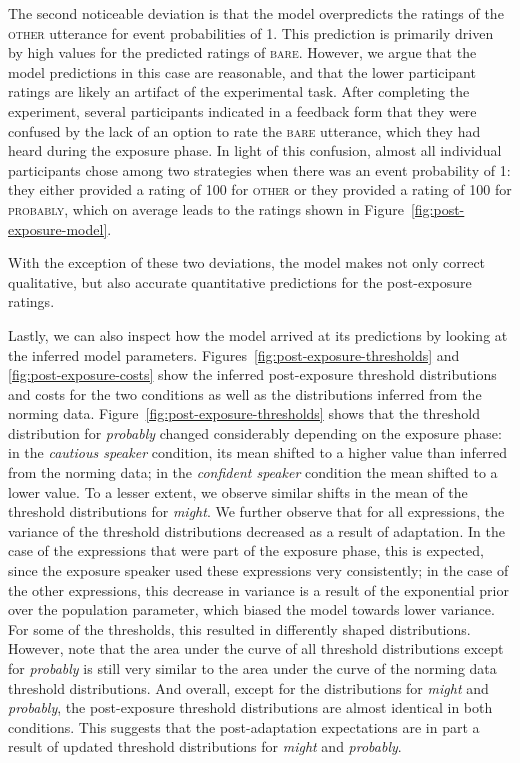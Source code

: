 \documentclass[lucida,biblatex]{sp} %
\newcommand{\figref}[1]{Figure~\ref{#1}}
\begin{document}
The second noticeable deviation is that the model overpredicts the ratings of the \textsc{other} utterance for event probabilities of 1. This prediction is primarily driven by high values for the predicted ratings of \textsc{bare}. However, we argue that the model predictions in this case are reasonable, and that the lower participant ratings are likely an artifact of the experimental task. After completing the experiment, 
several participants indicated in a feedback form that they were confused by the lack of an option to rate the \textsc{bare} utterance, 
which they had heard during the exposure phase. In light of this confusion, almost all individual participants chose among two strategies when there was an event probability of 1: they either provided a rating of 100 for \textsc{other} 
or they provided a rating of 100 for \textsc{probably}, which on average leads to the ratings shown in \figref{fig:post-exposure-model}.

With the exception of these two deviations, the model makes not only correct qualitative, but also accurate quantitative predictions for the post-exposure ratings.

Lastly, we can also inspect how the model arrived at its predictions by looking at the inferred model parameters.  
Figures~\ref{fig:post-exposure-thresholds} and \ref{fig:post-exposure-costs} show the inferred
post-exposure threshold distributions and costs for the two conditions as well as the distributions inferred from the norming data.
Figure~\ref{fig:post-exposure-thresholds} shows that the threshold distribution for \textit{probably}
changed considerably depending on the exposure phase: in the \textit{cautious speaker} condition,
its mean shifted to a higher value than  inferred from the norming data; in the \textit{confident speaker} condition the mean 
shifted to a lower value. To a lesser extent, we observe similar shifts in the mean of the threshold
distributions for \textit{might}. We further observe that for all expressions, the variance of the threshold
distributions decreased as a result of adaptation. In the case of the expressions that were part of the exposure
phase, this is expected, since the exposure speaker used these expressions very consistently; in the case of the
other expressions, this decrease in variance is a result of the exponential prior over the population parameter,
which biased the model towards lower variance. For some of the thresholds, this resulted in differently shaped distributions.
However, note that the area under the curve of all threshold distributions except for \textit{probably} is still very similar to the 
area under the curve of the norming data threshold distributions. And overall, except for the distributions
for \textit{might} and \textit{probably}, the post-exposure threshold distributions are almost identical in both conditions.
This suggests that the post-adaptation expectations 
are in part a result of updated threshold distributions for \textit{might} and \textit{probably}.
\end{document}
